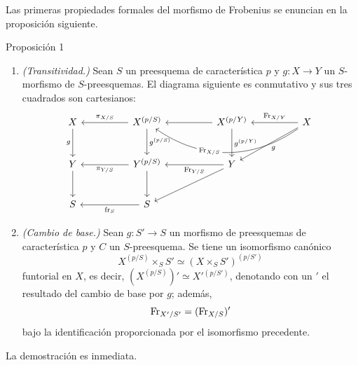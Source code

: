 Las primeras propiedades formales del morfismo de Frobenius se enuncian en la proposición siguiente.

\begin{statement}{Proposición 1}
\begin{enumerate}[label=\alph*)]
\item \emph{(Transitividad.)} Sean $S$ un preesquema de característica $p$ y $g:X\to Y$ un $S$-morfismo de $S$-preesquemas. El diagrama siguiente es conmutativo y sus tres cuadrados son cartesianos:
\[
\begin{tikzcd}[column sep=huge,row sep=large]
X \arrow[d,"g"'] & X^{(p/S)} \arrow[l,"\pi_{X/S}"'] \arrow[d,"g^{(p/S)}"] & X^{(p/Y)} \arrow[l] \arrow[d,"g^{(p/Y)}"] & X \arrow[l,"\Fr_{X/Y}"'] \arrow[ll,bend left=35,"\Fr_{X/S}"{description,pos=0.62}] \arrow[dl,"g"] \\
Y \arrow[d] & Y^{(p/S)} \arrow[l,"\pi_{Y/S}"] \arrow[d] & Y \arrow[l,"\Fr_{Y/S}"] \arrow[dl] & {} \\
S & S \arrow[l,"\fr_S"] & {} & {}
\end{tikzcd}
\]

\item \emph{(Cambio de base.)} Sean $g:S'\to S$ un morfismo de preesquemas de característica $p$ y $C$ un $S$-preesquema. Se tiene un isomorfismo canónico
\[
X^{(p/S)}\times_S S'\simeq (X\times_S S')^{(p/S')}
\]
funtorial en $X$, es decir, $(X^{(p/S)})'\simeq X'{}^{(p/S')}$, denotando con un $'$ el resultado del cambio de base por $g$; además,
\[
\operatorname{Fr}_{X'/S'}=(\operatorname{Fr}_{X/S})'
\]
bajo la identificación proporcionada por el isomorfismo precedente.
\end{enumerate}
\end{statement}

La demostración es inmediata.

